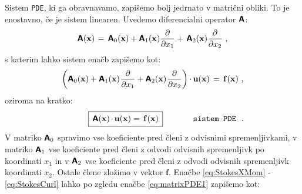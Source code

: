Sistem \texttt{PDE}, ki ga obravnavamo, zapišemo bolj jedrnato v matrični obliki. To je enostavno, če je sistem linearen. Uvedemo diferencialni operator $\bm{\mathsf{A}}$:
\begin{equation}
	\mathbsf{A}(\mathbf{x}) \mkern2mu
	=
	\, \mathbsf{A}_0(\mathbf{x}) + \mathbsf{A}_1(\mathbf{x}) \frac{\pd}{\pd x_1} + \, \mathbsf{A}_2(\mathbf{x}) \frac{\pd}{\pd x_2} \ ,
	\label{eq:AMatrixDefinition}
	\vspace{-1mm}
\end{equation}
\vspace{1mm}
s katerim lahko sistem enačb zapišemo kot:
\begin{equation}
	\left(\mathbsf{A}_0(\mathbf{x}) + \mathbsf{A}_1(\mathbf{x}) \mkern1mu \frac{\pd}{\pd x_1} + \mathbsf{A}_2(\mathbf{x}) \mkern1mu \frac{\pd}{\pd x_2}\right) \mkern-1mu \cdot \mkern-1mu \mathbf{u}(\mathbf{x}) \, = \, \mathbf{f}(\mathbf{x}) \ ,
	\label{eq:matrixPDE1}
	\vspace{-1mm}
\end{equation}
oziroma na kratko:
\vspace{2mm}
\begin{equation}
	\hspace{12mm} \boxed{
		\, \vphantom{\big(} \mathbsf{A}(\mathbf{x}) \mkern-1.5mu \cdot \mkern-1.5mu \mathbf{u}(\mathbf{x}) = \, \mathbf{f}(\mathbf{x}) \,
	}\hspace{1.3cm} \texttt{sistem PDE .}
	\label{eq:compactPDE}
	\vspace{1.5mm}
\end{equation}
V matriko $\bm{\mathsf{A}}_0$ spravimo vse koeficiente pred členi z odvisnimi spremenljivkami, v matriko $\bm{\mathsf{A}}_1$ vse koeficiente pred členi z odvodi odvisnih spremenljivk po koordinati $x_1$ in v $\bm{\mathsf{A}}_2$ vse koeficiente pred členi z odvodi odvisnih spremenljivk koordinati $x_2$. Ostale člene zložimo v vektor $\mathbf{f}$. Enačbe \eqref{eq:StokesXMom} - \eqref{eq:StokesCurl} lahko po zgledu enačbe \eqref{eq:matrixPDE1} zapišemo kot:
\vspace{1.5mm}

